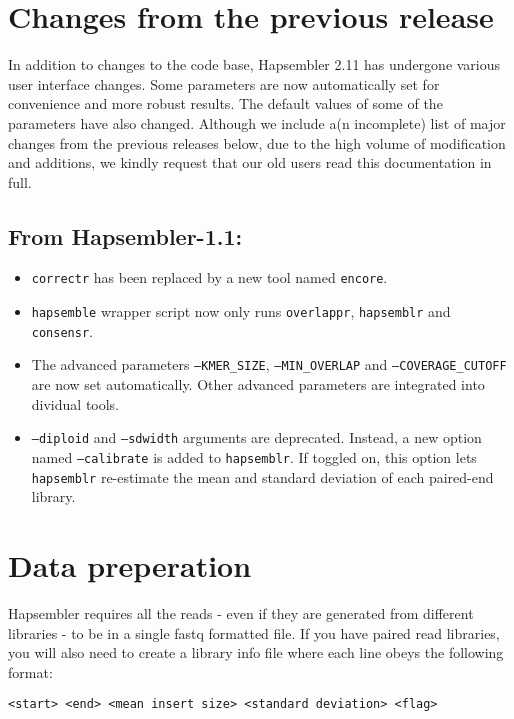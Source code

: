 \documentclass[12pt,a4paper]{report}
\newcommand{\hapversion}{2.11}
\begin{document}
\section{Changes from the previous release}

In addition to changes to the code base, Hapsembler \hapversion{} has undergone various user interface changes. Some parameters are now automatically set for convenience and more robust results. The default values of some of the parameters have also changed. Although we include a(n incomplete) list of major changes from the previous releases below, due to the high volume of modification and additions, we kindly request that our old users read this documentation in full.

\subsection{From Hapsembler-1.1:}

\begin{itemize}
\item \texttt{correctr} has been replaced by a new tool named \texttt{encore}.
\item \texttt{hapsemble} wrapper script now only runs \texttt{overlappr}, \texttt{hapsemblr} and \texttt{consensr}.
\item The advanced parameters \texttt{--KMER\_SIZE}, \texttt{--MIN\_OVERLAP} and \texttt{--COVERAGE\_CUTOFF} are now set automatically. Other advanced parameters are integrated into dividual tools.
\item \texttt{--diploid} and \texttt{--sdwidth} arguments are deprecated. Instead, a new option named \texttt{--calibrate} is added to \texttt{hapsemblr}. If toggled on, this option lets \texttt{hapsemblr} re-estimate the mean and standard deviation of each paired-end library.
\end{itemize}

\section{Data preperation}
\label{data}

Hapsembler requires all the reads - even if they are generated from different libraries - to be in a single fastq formatted file. If you have paired read libraries, you will also need to create a library info file where each line obeys the following format:

\begin{verbatim}
<start> <end> <mean insert size> <standard deviation> <flag>
\end{verbatim}
\end{document}
